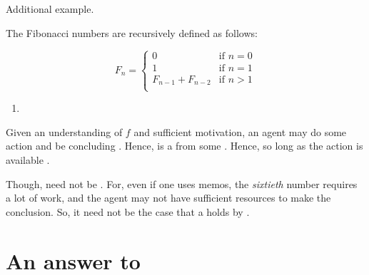 \begin{note}
  Additional example.

  \begin{scenario}%
    \label{scen:fc:fib}%
    The Fibonacci numbers are recursively defined as follows:

    \[
      F_{n} = \left\{
        \begin{array}{ll}
          0 & \text{if } n = 0 \\
          1 & \text{if } n = 1 \\
          F_{n-1} + F_{n-2} & \text{if } n > 1 \\
        \end{array}
      \right.
    \]
  \end{scenario}

  \begin{enumerate}[label=C\thescenarioCounter., ref=(C\thescenarioCounter)]
  \item
    \label{scen:fc:fib:c}
  \end{enumerate}
  Given an understanding of \(f\) and sufficient motivation, an agent may do some action and be concluding .
  Hence,  is a \fc{} from some \pool{}.
  Hence, so long as the action is available .

  Though,  need not be .
  For, even if one uses memos, the \emph{sixtieth} number requires a lot of work, and the agent may not have sufficient resources to make the conclusion.
  So, it need not be the case that a \fingfr{} holds by \supportII{}.
\end{note}


\section{An answer to \qWhy{}}


